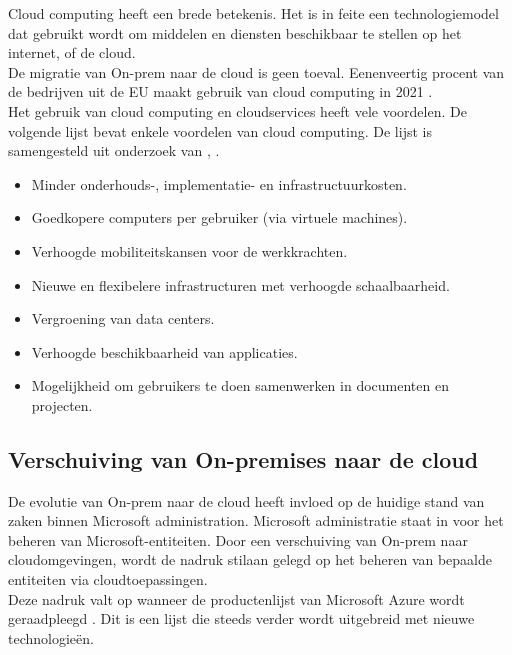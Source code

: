 
Cloud computing heeft een brede betekenis. Het is in feite een technologiemodel dat gebruikt wordt om middelen en diensten beschikbaar te stellen op het internet, of de cloud. \autocite{Haag2009} \\

De migratie van \ac{On-prem} naar de cloud is geen toeval. Eenenveertig procent van de bedrijven uit de \ac{EU} maakt gebruik van cloud computing in 2021 \autocite{EU2021}. \\

Het gebruik van cloud computing en cloudservices heeft vele voordelen. De volgende lijst bevat enkele voordelen van cloud computing. De lijst is samengesteld uit onderzoek van \textcite{Aljabre2012}, \textcite{Rittinghouse2016}.

\begin{itemize}
    \item Minder onderhouds-, implementatie- en infrastructuurkosten.
    \item Goedkopere computers per gebruiker (via virtuele machines).
    \item Verhoogde mobiliteitskansen voor de werkkrachten.
    \item Nieuwe en flexibelere infrastructuren met verhoogde schaalbaarheid.
    \item Vergroening van data centers.
    \item Verhoogde beschikbaarheid van applicaties.
    \item Mogelijkheid om gebruikers te doen samenwerken in documenten en projecten.
\end{itemize}



\subsection{Verschuiving van On-premises naar de cloud}


De evolutie van \ac{On-prem} naar de cloud heeft invloed op de huidige stand van zaken binnen Microsoft administration. Microsoft administratie staat in voor het beheren van Microsoft-entiteiten. Door een verschuiving van \ac{On-prem} naar cloudomgevingen, wordt de nadruk stilaan gelegd op het beheren van bepaalde entiteiten via cloudtoepassingen. \\

Deze nadruk valt op wanneer de productenlijst van Microsoft Azure wordt geraadpleegd \autocite{Microsoft2023b}. Dit is een lijst die steeds verder wordt uitgebreid met nieuwe technologieën. \\

